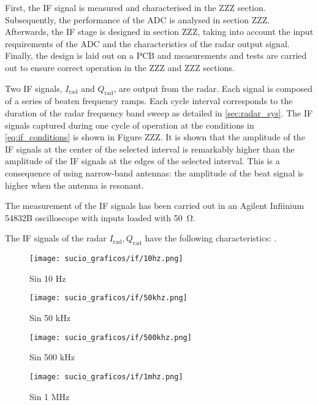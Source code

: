 First, the IF signal is measured and characterised in the ZZZ section. Subsequently, the performance of the ADC is analysed in section ZZZ. Afterwards, the IF stage is designed in section ZZZ, taking into account the input requirements of the ADC and the characteristics of the radar output signal. Finally, the design is laid out on a PCB and measurements and tests are carried out to ensure correct operation in the ZZZ and ZZZ sections.

Two IF signals, $I_\mathrm{rad}$ and $Q_\mathrm{rad}$, are output from the radar. Each signal is composed of a series of beaten frequency ramps. Each cycle interval corresponds to the duration of the radar frequency band sweep as detailed in \cref{sec:radar_sys}. The IF signals captured during one cycle of operation at the conditions in \cref{eq:if_conditions} is shown in Figure ZZZ. It is shown that the amplitude of the IF signals at the center of the selected interval is remarkably higher than the amplitude of the IF signals at the edges of the selected interval. This is a consequence of using narrow-band antennas: the amplitude of the beat signal is higher when the antenna is resonant.

The measurement of the IF signals has been carried out in an Agilent Infiinium 54832B oscilloscope with inputs loaded with \SI{50}{\ohm}.

The IF signals of the radar $I_\mathrm{rad},Q_\mathrm{rad}$ have the following characteristics:
.

\begin{figure}[ht]
	\centering
	\texttt{[image: sucio\_graficos/if/10hz.png]}
	\caption{Sin 10 Hz}
	\label{fig:moduloaprox50cmplancha}
\end{figure}
\begin{figure}[ht]
	\centering
	\texttt{[image: sucio\_graficos/if/50khz.png]}
	\caption{Sin 50 kHz}
	\label{fig:moduloaprox50cmplancha}
\end{figure}
\begin{figure}[ht]
	\centering
	\texttt{[image: sucio\_graficos/if/500khz.png]}
	\caption{Sin 500 kHz}
	\label{fig:moduloaprox50cmplancha}
\end{figure}
\begin{figure}[ht]
	\centering
	\texttt{[image: sucio\_graficos/if/1mhz.png]}
	\caption{Sin 1 MHz}
	\label{fig:moduloaprox50cmplancha}
\end{figure}

